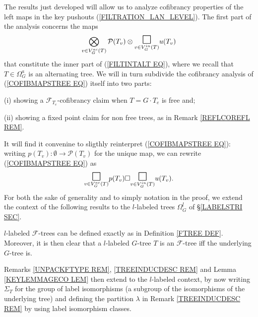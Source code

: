 \documentclass[a4paper,10pt]{article}%
\begin{document}
The results just developed will allow us to 
analyze cofibrancy properties of the left maps in the key pushouts (\ref{FILTRATION_LAN_LEVEL}). The first part of the analysis concerns the maps  
\begin{equation}\label{COFIBMAPSTREE EQ}
	\bigotimes\limits_{v \in V_{G}^{ac}(T)}\P(T_v) \otimes
	\underset{v \in V_{G}^{in}(T)}
	{\mathlarger{\mathlarger{\mathlarger{\square}}}}
	u(T_v)
\end{equation}
that constitute the inner part of (\ref{FILTINTALT EQ}),
where we recall that $T \in \Omega_G^a$ is an alternating tree.
We will in turn subdivide the cofibrancy analysis of 
(\ref{COFIBMAPSTREE EQ}) itself into two parts:
\begin{inparaenum}
\item[(i)] showing a $\mathcal{F}_{T_e}$-cofibrancy claim when $T=G \cdot T_e$ is free and;
\item[(ii)] showing a fixed point claim for non free trees, 
as in Remark \ref{REFLCOREFL REM}.
\end{inparaenum}

It will find it convenine to  sligthly reinterpret (\ref{COFIBMAPSTREE EQ}): writing 
$p(T_v)\colon \emptyset \to \mathcal{P}(T_v)$
for the unique map, 
we can rewrite (\ref{COFIBMAPSTREE EQ}) as
\[
	\underset{v \in V_{G}^{ac}(T)}
	{\mathlarger{\mathlarger{\mathlarger{\square}}}}
	p(T_v) 
		\square
	\underset{v \in V_{G}^{in}(T)}
	{\mathlarger{\mathlarger{\mathlarger{\square}}}}
	u(T_v).
\]
For both the sake of generality and to simply notation in the proof, we extend the context of the following results to the 
$l$-labeled trees
$\Omega_G^{\underline{l}}$
of \S \ref{LABELSTRI SEC}.


\begin{remark}
$l$-labeled $\mathcal{F}$-trees can be defined exactly as in Definition \ref{FTREE DEF}. Moreover, it is then clear that a $l$-labeled $G$-tree $T$ is an $\mathcal{F}$-tree iff the underlying $G$-tree is.

Remarks \ref{UNPACKFTYPE REM}, \ref{TREEINDUCDESC REM}
and Lemma \ref{KEYLEMMAGECO LEM} then extend to the $l$-labeled context, by now writing $\Sigma_T$ for the group of label isomorphisms (a subgroup of the isomorphisms of the underlying tree) and defining the partition $\lambda$ 
in Remark \ref{TREEINDUCDESC REM}
by using label isomorphism classes.
\end{remark}
 
\end{document}
